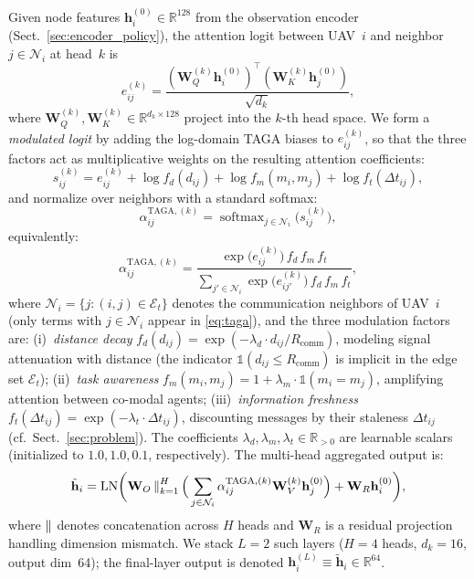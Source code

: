 Given node features $\mathbf{h}_i^{(0)} \!\in\! \mathbb{R}^{128}$ from the
observation encoder (Sect.~\ref{sec:encoder_policy}), the attention logit
between UAV~$i$ and neighbor~$j \!\in\! \mathcal{N}_i$ at head~$k$ is
\begin{equation}
  e_{ij}^{(k)} = \frac{(\mathbf{W}_Q^{(k)} \mathbf{h}_i^{(0)})^\top
  (\mathbf{W}_K^{(k)} \mathbf{h}_j^{(0)})}{\sqrt{d_k}},
  \label{eq:attn_logit}
\end{equation}
where $\mathbf{W}_Q^{(k)}, \mathbf{W}_K^{(k)} \!\in\! \mathbb{R}^{d_k \times 128}$
project into the $k$-th head space.
We form a \emph{modulated logit} by adding the log-domain TAGA biases to
$e_{ij}^{(k)}$, so that the three factors act as multiplicative weights on the
resulting attention coefficients:
\begin{equation}
  s_{ij}^{(k)} = e_{ij}^{(k)}
    + \log f_d(d_{ij})
    + \log f_m(m_i, m_j)
    + \log f_t(\Delta t_{ij}),
  \label{eq:taga_s}
\end{equation}
and normalize over neighbors with a standard softmax:
\begin{equation}
  \alpha_{ij}^{\text{TAGA},(k)} = \operatorname{softmax}_{j \in \mathcal{N}_i}\!\big(s_{ij}^{(k)}\big),
  \label{eq:taga_softmax}
\end{equation}
equivalently:
\begin{equation}
  \alpha_{ij}^{\text{TAGA},(k)} = \frac{
    \exp\!\big(e_{ij}^{(k)}\big)\, f_d\, f_m\, f_t
  }{
    \sum_{j' \in \mathcal{N}_i} \exp\!\big(e_{ij'}^{(k)}\big)\, f_d\, f_m\, f_t
  },
  \label{eq:taga}
\end{equation}
where $\mathcal{N}_i = \{j : (i,j) \!\in\! \mathcal{E}_t\}$ denotes the
communication neighbors of UAV~$i$ (only terms with $j \!\in\! \mathcal{N}_i$
appear in \eqref{eq:taga}), and the three modulation factors are:
(i)~\emph{distance decay}
$f_d(d_{ij}) = \exp(-\lambda_d \cdot d_{ij}/R_{\text{comm}})$, modeling
signal attenuation with distance (the indicator
$\mathbb{1}(d_{ij} \!\leq\! R_{\text{comm}})$ is implicit in the edge set
$\mathcal{E}_t$);
(ii)~\emph{task awareness}
$f_m(m_i, m_j) = 1 + \lambda_m \cdot \mathbb{1}(m_i \!=\! m_j)$, amplifying
attention between co-modal agents; (iii)~\emph{information freshness}
$f_t(\Delta t_{ij}) = \exp(-\lambda_t \cdot \Delta t_{ij})$, discounting
messages by their staleness $\Delta t_{ij}$ (cf.\ Sect.~\ref{sec:problem}).
The coefficients $\lambda_d, \lambda_m, \lambda_t \!\in\! \mathbb{R}_{>0}$
are learnable scalars (initialized to $1.0, 1.0, 0.1$, respectively).
The multi-head aggregated output is:
\begin{equation}
  \tilde{\mathbf{h}}_i = \operatorname{LN}\!\bigg(\mathbf{W}_O
  \operatorname{\|}_{k=1}^{H}\Big(\sum_{j \in \mathcal{N}_i}
  \alpha_{ij}^{\text{TAGA},(k)} \mathbf{W}_V^{(k)} \mathbf{h}_j^{(0)}\Big)
  + \mathbf{W}_R \mathbf{h}_i^{(0)}\bigg),
  \label{eq:taga_agg}
\end{equation}
where $\operatorname{\|}$ denotes concatenation across $H$ heads and $\mathbf{W}_R$ is a
residual projection handling dimension mismatch.  We stack $L\!=\!2$ such
layers ($H\!=\!4$ heads, $d_k\!=\!16$, output dim~64); the final-layer output
is denoted $\mathbf{h}_i^{(L)} \!\equiv\! \tilde{\mathbf{h}}_i
\!\in\! \mathbb{R}^{64}$.

